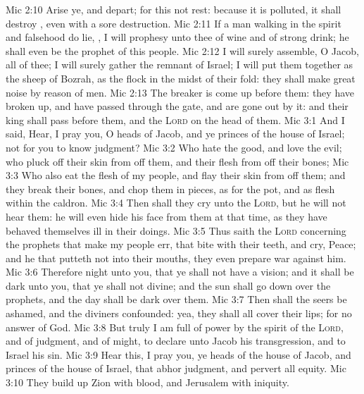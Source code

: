 \vs Mic 2:10 Arise ye, and depart; for this  not  rest: because it is polluted, it shall destroy , even with a sore destruction.
\vs Mic 2:11 If a man walking in the spirit and falsehood do lie, , I will prophesy unto thee of wine and of strong drink; he shall even be the prophet of this people.
\vs Mic 2:12 I will surely assemble, O Jacob, all of thee; I will surely gather the remnant of Israel; I will put them together as the sheep of Bozrah, as the flock in the midst of their fold: they shall make great noise by reason of  men.
\vs Mic 2:13 The breaker is come up before them: they have broken up, and have passed through the gate, and are gone out by it: and their king shall pass before them, and the \textsc{Lord} on the head of them.
\vs Mic 3:1 And I said, Hear, I pray you, O heads of Jacob, and ye princes of the house of Israel;  not for you to know judgment?
\vs Mic 3:2 Who hate the good, and love the evil; who pluck off their skin from off them, and their flesh from off their bones;
\vs Mic 3:3 Who also eat the flesh of my people, and flay their skin from off them; and they break their bones, and chop them in pieces, as for the pot, and as flesh within the caldron.
\vs Mic 3:4 Then shall they cry unto the \textsc{Lord}, but he will not hear them: he will even hide his face from them at that time, as they have behaved themselves ill in their doings.
\vs Mic 3:5 Thus saith the \textsc{Lord} concerning the prophets that make my people err, that bite with their teeth, and cry, Peace; and he that putteth not into their mouths, they even prepare war against him.
\vs Mic 3:6 Therefore night  unto you, that ye shall not have a vision; and it shall be dark unto you, that ye shall not divine; and the sun shall go down over the prophets, and the day shall be dark over them.
\vs Mic 3:7 Then shall the seers be ashamed, and the diviners confounded: yea, they shall all cover their lips; for  no answer of God.
\vs Mic 3:8 But truly I am full of power by the spirit of the \textsc{Lord}, and of judgment, and of might, to declare unto Jacob his transgression, and to Israel his sin.
\vs Mic 3:9 Hear this, I pray you, ye heads of the house of Jacob, and princes of the house of Israel, that abhor judgment, and pervert all equity.
\vs Mic 3:10 They build up Zion with blood, and Jerusalem with iniquity.
